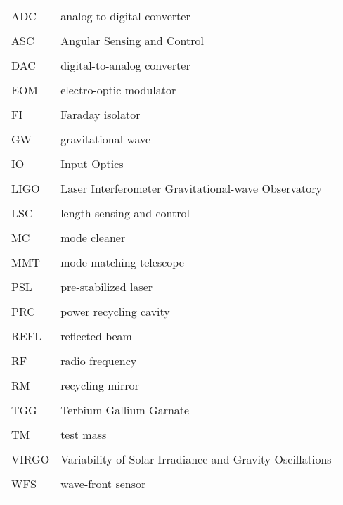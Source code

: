\singlespacing
\begin{tabular}{lp{5in}}
ADC & analog-to-digital converter \\
\\
ASC & Angular Sensing and Control \\
\\
DAC & digital-to-analog converter\\
\\
EOM & electro-optic modulator \\
\\
FI & Faraday isolator \\
\\
GW & gravitational wave \\
\\
IO & Input Optics \\
\\
LIGO & Laser Interferometer Gravitational-wave Observatory \\
\\
LSC & length sensing and control \\
\\
MC & mode cleaner \\
\\
MMT & mode matching telescope \\
\\
PSL & pre-stabilized laser \\
\\
PRC & power recycling cavity \\
\\
REFL & reflected beam \\
\\
RF & radio frequency \\
\\
RM & recycling mirror \\
\\
TGG & Terbium Gallium Garnate \\
\\
TM & test mass \\
\\
VIRGO & Variability of Solar Irradiance and Gravity Oscillations \\
\\
WFS & wave-front sensor \\
\\
\end{tabular}
\doublespacing

